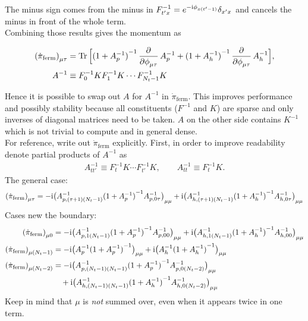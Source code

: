 \documentclass[a4paper, fleqn, twoside, notitlepage]{scrartcl}
\begin{document}
The minus sign comes from the minus in $F^{-1}_{t'x} = e^{-\mathrm{i}\phi_{x(t'-1)}}\delta_{x'x}$ and cancels the minus in front of the whole term.\\
Combining those results gives the momentum as
\begin{resultbox}
  \vspace{-\baselineskip}
  \begin{align}
    {(\dot{\pi}_{\text{ferm}})}_{\mu\tau} &= \Tr \Big[{(1+A_p^{-1})}^{-1}\dpd{}{\phi_{\mu\tau}}A_p^{-1} + {(1+A_h^{-1})}^{-1}\dpd{}{\phi_{\mu\tau}}A_h^{-1}\Big],\\
    A^{-1} &\equiv F_0^{-1}K F_1^{-1}K \cdots F_{N_t-1}^{-1}K\label{eq:def_Ainv}
  \end{align}
\end{resultbox}
\noindent Hence it is possible to swap out $A$ for $A^{-1}$ in $\dot{\pi}_{\text{ferm}}$. This improves performance and possibly stability because all constituents ($F^{-1}$ and $K$) are sparse and only inverses of diagonal matrices need to be taken. $A$ on the other side contains $K^{-1}$ which is not trivial to compute and in general dense.\\

\noindent
For reference, write out $\dot{\pi}_{\text{ferm}}$ explicitly. First, in order to improve readability denote partial products of $A^{-1}$ as
\begin{align}
  A^{-1}_{tt'} \equiv F_t^{-1}K \cdots F_{t'}^{-1}K, \qquad A^{-1}_{tt} \equiv F_t^{-1}K.
\end{align}
The general case:
\begin{align}
  {(\dot{\pi}_{\text{ferm}})}_{\mu\tau} = -\mathrm{i} {\big(A^{-1}_{p,(\tau+1)(N_t-1)} {(1+A_p^{-1})}^{-1} A^{-1}_{p,0\tau}\big)}_{\mu\mu} + \mathrm{i} {\big(A^{-1}_{h,(\tau+1)(N_t-1)} {(1+A_h^{-1})}^{-1} A^{-1}_{h,0\tau}\big)}_{\mu\mu}
\end{align}
Cases new the boundary:
\begin{align}
  {(\dot{\pi}_{\text{ferm}})}_{\mu0} &= -\mathrm{i} {\big(A^{-1}_{p,1(N_t-1)} {(1+A_p^{-1})}^{-1} A^{-1}_{p,00}\big)}_{\mu\mu} + \mathrm{i} {\big(A^{-1}_{h,1(N_t-1)} {(1+A_h^{-1})}^{-1} A^{-1}_{h,00}\big)}_{\mu\mu}\\
  {(\dot{\pi}_{\text{ferm}})}_{\mu(N_t-1)} &= -\mathrm{i} {\big(A^{-1}_{p} {(1+A_p^{-1})}^{-1}\big)}_{\mu\mu} + \mathrm{i} {\big(A^{-1}_{h} {(1+A_h^{-1})}^{-1}\big)}_{\mu\mu}\\
  {(\dot{\pi}_{\text{ferm}})}_{\mu(N_t-2)} &= -\mathrm{i} {\big(A^{-1}_{p,(N_t-1)(N_t-1)} {(1+A_p^{-1})}^{-1} A^{-1}_{p,0(N_t-2)}\big)}_{\mu\mu} \nonumber\\
                                 &\quad + \mathrm{i} {\big(A^{-1}_{h,(N_t-1)(N_t-1)} {(1+A_h^{-1})}^{-1} A^{-1}_{h,0(N_t-2)}\big)}_{\mu\mu}
\end{align}
Keep in mind that $\mu$ is \emph{not} summed over, even when it appears twice in one term.


\clearpage


\end{document}
